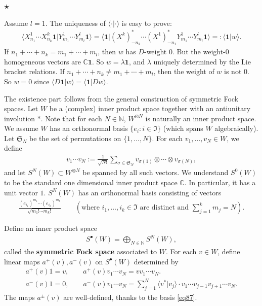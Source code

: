 \documentclass[11pt,b5paper,notitlepage]{article}
\theoremstyle{definition}
\theoremstyle{plain}
\newcommand{\fk}{\mathfrak}
\newcommand{\id}{\mathbf{1}}
\newcommand{\bk}[1]{\langle {#1}\rangle}
\newcommand{\blt}{\bullet}
\newcommand{\Cbb}{\mathbb C}
\newcommand{\Nbb}{\mathbb N}
\numberwithin{equation}{section}
\begin{document}
\subsection{$\star$}
Assume $l=1$. The uniqueness of $\bk{\cdot|\cdot}$ is easy to prove:
\begin{align*}
\bk{X^1_{n_1}\cdots X^k_{n_k}\id|Y^1_{m_1}\cdots Y^l_{m_l}\id}=	\bk{\id|(X^k)^*_{-n_k}\cdots (X^1)^*_{-n_1}Y^1_{m_1}\cdots Y^l_{m_l}\id}=:\bk{\id|w}.
\end{align*}
If $n_1+\cdots+n_k=m_1+\cdots+m_l$, then $w$ has $D$-weight $0$. But the weight-$0$ homogeneous vectors are $\Cbb\id$. So $w=\lambda\id$, and $\lambda$ uniquely determined by the Lie bracket relations. If $n_1+\cdots+n_k\neq m_1+\cdots+m_l$, then the weight of $w$ is not $0$. So $w=0$ since $\bk{D\id|w}=\bk{\id|Dw}$.

The existence part follows from the general construction of symmetric Fock spaces. Let $W$ be a (complex) inner product space together with an antiunitary involution $*$. Note that for each $N\in\Nbb$, $W^{\otimes N}$ is naturally an inner product space. We assume $W$ has an orthonormal basis $\{e_i:i\in\fk I\}$ (which spans $W$ algebraically). Let $\fk S_N$ be the set of permutations on $\{1,\dots,N\}$. For each $v_1,\dots,v_N\in W$, we define
\begin{align*}
v_1\cdots v_N:=\frac 1{\sqrt{N!}}\sum_{\sigma\in\fk S_N}v_{\sigma(1)}\otimes\cdots \otimes v_{\sigma(N)},
\end{align*}
and let $S^N(W)\subset W^{\otimes N}$ be spanned by all such vectors. We understand $S^0(W)$ to be the standard one dimensional inner product space $\Cbb$. In particular, it has a unit vector $1$. $S^N(W)$ has an orthonormal basis consisting of vectors
\begin{align}
\frac {(e_{i_1})^{m_1}\cdots (e_{i_k})^{m_k}}{\sqrt{m_1!\cdots m_k!}}\qquad(\text{where }i_1,\dots,i_k\in\fk I\text{ are distinct and }\sum_{j=1}^k m_j=N).	\label{eq87}
\end{align}



Define an inner product space
\begin{align}
S^\blt(W)=\bigoplus_{N\in\Nbb} S^N(W),	
\end{align}
called the \textbf{symmetric Fock space} associated to $W$. For each $v\in W$, define linear maps $a^+(v),a^-(v)$ on $S^\blt(W)$ determined by
\begin{subequations}
\begin{gather}
a^+(v)1=v,\qquad a^+(v)v_1\cdots v_N=vv_1\cdots v_N.\\
a^-(v)1=0,\qquad a^-(v)v_1\cdots v_N=\sum_{j=1}^N \bk{v^*|v_j}\cdot v_1\cdots v_{j-1}v_{j+1}\cdots v_N.
\end{gather}
\end{subequations}
The maps $a^\pm(v)$ are well-defined, thanks to the basis \eqref{eq87}.
\end{document}
